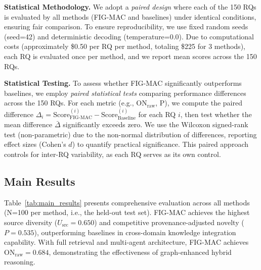 \documentclass[runningheads]{llncs}
\begin{document}
\textbf{Statistical Methodology.} We adopt a \textit{paired design} where each of the 150 RQs is evaluated by all methods (FIG-MAC and baselines) under identical conditions, ensuring fair comparison. To ensure reproducibility, we use fixed random seeds (seed=42) and deterministic decoding (temperature=0.0). Due to computational costs (approximately \$0.50 per RQ per method, totaling \$225 for 3 methods), each RQ is evaluated once per method, and we report mean scores across the 150 RQs. 

\textbf{Statistical Testing.} To assess whether FIG-MAC significantly outperforms baselines, we employ \textit{paired statistical tests} comparing performance differences across the 150 RQs. For each metric (e.g., ON$_{\text{raw}}$, P), we compute the paired difference $\Delta_i = \text{Score}_{\text{FIG-MAC}}^{(i)} - \text{Score}_{\text{Baseline}}^{(i)}$ for each RQ $i$, then test whether the mean difference $\bar{\Delta}$ significantly exceeds zero. We use the Wilcoxon signed-rank test (non-parametric) due to the non-normal distribution of differences, reporting effect sizes (Cohen's $d$) to quantify practical significance. This paired approach controls for inter-RQ variability, as each RQ serves as its own control.


\subsection{Main Results}
\label{sec:main_results}

Table~\ref{tab:main_results} presents comprehensive evaluation across all methods (N=100 per method, i.e., the held-out test set). FIG-MAC achieves the highest source diversity ($U_{\text{src}} = \mathbf{0.650}$) and competitive provenance-adjusted novelty ($P=0.535$), outperforming baselines in cross-domain knowledge integration capability. With full retrieval and multi-agent architecture, FIG-MAC achieves ON$_{\text{raw}}=0.684$, demonstrating the effectiveness of graph-enhanced hybrid reasoning.
\end{document}
